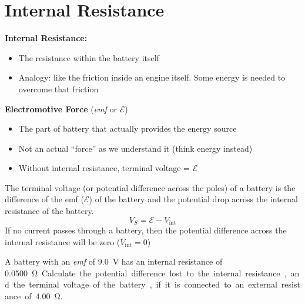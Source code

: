 




\section{Internal Resistance}

\textbf{Internal Resistance:}
\begin{itemize}
\item The resistance within the battery itself
\item Analogy: like the friction inside an engine itself. Some energy is
  needed to overcome that friction
\end{itemize}
\textbf{Electromotive Force} (\emph{emf} or $\mathcal E$)
\begin{itemize}
\item The part of battery that actually provides the energy source
\item Not an actual ``force'' as we understand it (think energy instead)
\item Without internal resistance, terminal voltage = $\mathcal E$
\end{itemize}
%
%
%
%
The terminal voltage (or potential difference across the poles) of a battery
is the difference of the emf ($\mathcal E$) of the battery and the potential
drop across the internal resistance of the battery.
\begin{equation}
  \boxed{V_S = \mathcal{E}-V_\text{int}}
\end{equation}
If no current passes through a battery, then the potential difference across
the internal resistance will be zero ($V_\text{int}=0$)

\begin{example}
  A battery with an \emph{emf} of \SI{9.0}{\volt} has an internal resistance of
  \SI{.0500}\ohm. Calculate the potential difference lost to the internal
  resistance, and the terminal voltage of the battery, if it is connected to an
  external resistance of \SI{4.00}\ohm.
\end{example}
